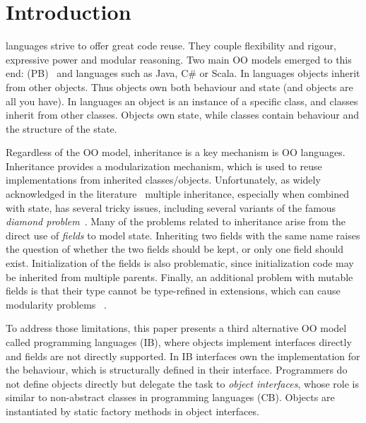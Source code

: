 \section{Introduction}\label{sec:intro}

\Objectoriented languages strive to offer great code reuse.
They couple flexibility and rigour, expressive power and
modular reasoning.  Two main OO models emerged to this end:
\prototypebased (PB)~\cite{Ungar87self} and \classbased languages such as
Java, C\# or Scala.  In \prototypebased
languages objects inherit from other objects. Thus objects own
both behaviour and state (and objects are all you have).
In \classbased languages an object is an instance of a specific class,
and classes inherit from other classes.  Objects own state,
while classes contain behaviour and the structure of the state.

Regardless of the OO model, inheritance is a key mechanism is OO 
languages. Inheritance provides a modularization mechanism, which 
is used to reuse implementations from inherited classes/objects. 
Unfortunately, as widely acknowledged in the literature~\cite{scharli03traits,Sak89dis,bracha90mixin,malayeri2009cz}
multiple inheritance, especially when combined with state, has several
tricky issues, including several variants of the famous 
\emph{diamond problem}~\cite{bracha90mixin,Sak89dis}. Many of the problems related to 
inheritance arise from the direct use of \emph{fields} to model state. 
Inheriting two fields with the same name raises 
the question of whether the two fields should be kept, or only one 
field should exist. Initialization 
of the fields is also problematic, since initialization code may be inherited from 
multiple parents. Finally, an additional problem with mutable fields is that their 
type cannot be type-refined in extensions, which can cause modularity problems
~\cite{wadler98expression,eptrivially}.

To address those limitations, this paper presents a third alternative
OO model called \emph{\interfacebased} \objectoriented programming
languages (IB), where objects implement interfaces directly and fields
are not directly supported. In IB interfaces own the implementation for the
behaviour, which is structurally defined in their
interface. Programmers do not define objects directly but delegate the
task to \emph{object interfaces}, whose role is similar to
non-abstract classes in \classbased \objectoriented programming
languages (CB). Objects are instantiated by static factory methods in
object interfaces.

